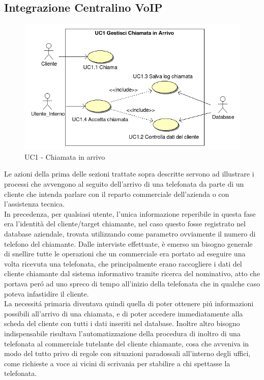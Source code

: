 \newpage
\subsection{Integrazione Centralino VoIP}
\begin{figure}[!ht]
\centering
 \includegraphics[scale=0.8]{./images/UC1_chiamata.png}
\caption{UC1 - Chiamata in arrivo}
\end{figure}

\noindent
Le azioni della prima delle sezioni trattate sopra descritte servono ad illustrare i processi che avvengono al seguito dell'arrivo di una telefonata da parte di un cliente che intenda parlare con il reparto commerciale dell'azienda o con l'assistenza tecnica. \\
In precedenza, per qualsiasi utente, l'unica informazione reperibile in questa fase era l'identit\`a del cliente/target chiamante, nel caso questo fosse registrato nel database aziendale, trovata utilizzando come parametro ovviamente il numero di telefono del chiamante. Dalle interviste effettuate, \`e emerso un bisogno generale di snellire tutte le operazioni che un commerciale era portato ad eseguire una volta ricevuta una telefonata, che principalmente erano raccogliere i dati del cliente chiamante dal sistema informativo tramite ricerca del nominativo, atto che portava per\'o ad uno spreco di tempo all'inizio della telefonata che in qualche caso poteva infastidire il cliente. \\
La necessit\'a primaria diventava quindi quella di poter ottenere pi\'u informazioni possibili all'arrivo di una chiamata, e di poter accedere immediatamente alla scheda del cliente con tutti i dati inseriti nel database. Inoltre altro bisogno indispensabile risultava l'automatizzazione della procedura di inoltro di una telefonata al commerciale tutelante del cliente chiamante, cosa che avveniva in modo del tutto privo di regole con situazioni paradossali all'interno degli uffici, come richieste a voce ai vicini di scrivania per stabilire a chi spettasse la telefonata.
